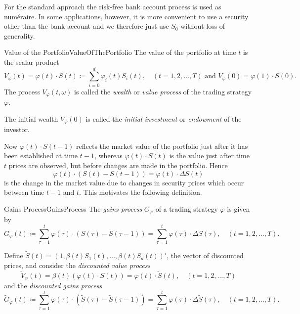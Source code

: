 For the standard approach the risk-free bank account process is used as num\'{e}raire. In some applications, however, it is more convenient to use a security other than the bank account and we therefore just use \(S_0\) without loss of generality.

\begin{defn}{Value of the Portfolio}{ValueOfThePortfolio}
	The value of the portfolio at time \(t\) is the scalar product
	\begin{equation*}
		V_\varphi(t) = \varphi(t) \cdot S(t) \coloneqq \sum_{i=0}^d \varphi_i(t)S_i(t), \quad (t=1, 2, \dots, T) \text{ and } V_\varphi(0) = \varphi(1) \cdot S(0).
	\end{equation*}
	The process \(V_\varphi(t, \omega)\) is called the \emph{wealth} or \emph{value process} of the trading strategy \(\varphi\).
\end{defn}

The initial wealth \(V_\varphi(0)\) is called the \emph{initial investment} or \emph{endowment} of the investor.

Now \(\varphi(t) \cdot S(t-1)\) reflects the market value of the portfolio just after it has been established at time \(t-1\), whereas \(\varphi(t) \cdot S(t)\) is the value just after time \(t\) prices are observed, but before changes are made in the portfolio. Hence
\begin{equation*}
	\varphi(t) \cdot (S(t) - S(t-1)) = \varphi(t) \cdot \Delta S(t)
\end{equation*}
is the change in the market value due to changes in security prices which occur between time \(t-1\) and \(t\). This motivates the following definition.

\begin{defn}{Gains Process}{GainsProcess}
	The \emph{gains process} \(G_\varphi\) of a trading strategy \(\varphi\) is given by
	\begin{equation*}
		G_\varphi(t) \coloneqq \sum_{\tau=1}^t \varphi(\tau) \cdot (S(\tau) - S(\tau-1)) = \sum_{\tau=1}^t \varphi(\tau) \cdot \Delta S(\tau), \quad (t=1, 2, \dots, T).
	\end{equation*}
\end{defn}

Define \(\tilde{S}(t) = (1, \beta(t)S_1(t), \dots, \beta(t)S_d(t))'\), the vector of discounted prices, and consider the \emph{discounted value process}
\begin{equation*}
	\tilde{V}_\varphi(t) = \beta(t)(\varphi(t) \cdot S(t)) = \varphi(t) \cdot \tilde{S}(t), \quad (t=1, 2, \dots, T)
\end{equation*}
and the \emph{discounted gains process}
\begin{equation*}
	\tilde{G}_\varphi(t) \coloneqq \sum_{\tau=1}^t \varphi(\tau) \cdot (\tilde{S}(\tau) - \tilde{S}(\tau-1)) = \sum_{\tau=1}^t \varphi(\tau) \cdot \Delta \tilde{S}(\tau), \quad (t=1, 2, \dots, T).
\end{equation*}

